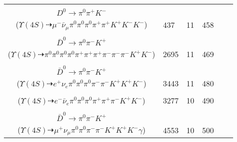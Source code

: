 \documentclass[landscape]{article}
\newcounter{rownumbers}
\newcommand\rn{\stepcounter{rownumbers}\arabic{rownumbers}}
\newcommand{\EOLP}{\\ \hline} %
\newcommand{\topoTags}[1]{#1} %
\begin{document}
\begin{longtable}{clcccc}
\rn & \makecell[l]{ $ 
\Upsilon(4S) \rightarrow B^{+} B^{-} ,
B^{+} \rightarrow \rho^{+} \bar{D}^{0} ,
B^{-} \rightarrow \mu^{-} \bar{\nu}_{\mu} D^{*0} ,
\rho^{+} \rightarrow \pi^{0} \pi^{+} ,
\bar{D}^{0} \rightarrow K^{+} K^{-} ,
D^{*0} \rightarrow \pi^{0} D^{0} ,
$ \\ $
D^{0} \rightarrow \pi^{0} \pi^{+} K^{-} 
$ \\ ($
\Upsilon(4S) \dashrightarrow \mu^{-} \bar{\nu}_{\mu} \pi^{0} \pi^{0} \pi^{0} \pi^{+} \pi^{+} K^{+} K^{-} K^{-} 
$) } & \topoTags{437 & }11 & 458 \EOLP

\rn & \makecell[l]{ $ 
\Upsilon(4S) \rightarrow B^{+} B^{-} ,
B^{+} \rightarrow \pi^{0} \pi^{+} \pi^{+} \pi^{-} \bar{D}^{*0} ,
B^{-} \rightarrow \rho^{-} D^{0} ,
\bar{D}^{*0} \rightarrow \pi^{0} \bar{D}^{0} ,
\rho^{-} \rightarrow \pi^{0} \pi^{-} ,
D^{0} \rightarrow \pi^{+} K^{-} ,
$ \\ $
\bar{D}^{0} \rightarrow \pi^{0} \pi^{-} K^{+} 
$ \\ ($
\Upsilon(4S) \dashrightarrow \pi^{0} \pi^{0} \pi^{0} \pi^{0} \pi^{+} \pi^{+} \pi^{+} \pi^{-} \pi^{-} \pi^{-} K^{+} K^{-} 
$) } & \topoTags{2695 & }11 & 469 \EOLP

\rn & \makecell[l]{ $ 
\Upsilon(4S) \rightarrow B^{+} B^{-} ,
B^{+} \rightarrow e^{+} \nu_{e} \bar{D}^{*0} ,
B^{-} \rightarrow \rho^{-} D^{0} ,
\bar{D}^{*0} \rightarrow \pi^{0} \bar{D}^{0} ,
\rho^{-} \rightarrow \pi^{0} \pi^{-} ,
D^{0} \rightarrow K^{+} K^{-} ,
$ \\ $
\bar{D}^{0} \rightarrow \pi^{0} \pi^{-} K^{+} 
$ \\ ($
\Upsilon(4S) \dashrightarrow e^{+} \nu_{e} \pi^{0} \pi^{0} \pi^{0} \pi^{-} \pi^{-} K^{+} K^{+} K^{-} 
$) } & \topoTags{3443 & }11 & 480 \EOLP

\rn & \makecell[l]{ $ 
\Upsilon(4S) \rightarrow B^{+} B^{-} ,
B^{+} \rightarrow \rho^{+} \bar{D}^{0} ,
B^{-} \rightarrow e^{-} \bar{\nu}_{e} D^{0} ,
\rho^{+} \rightarrow \pi^{0} \pi^{+} ,
\bar{D}^{0} \rightarrow \pi^{0} \pi^{-} K^{+} ,
D^{0} \rightarrow \pi^{0} \pi^{+} K^{-} 
$ \\ ($
\Upsilon(4S) \dashrightarrow e^{-} \bar{\nu}_{e} \pi^{0} \pi^{0} \pi^{0} \pi^{+} \pi^{+} \pi^{-} K^{+} K^{-} 
$) } & \topoTags{3277 & }10 & 490 \EOLP

\rn & \makecell[l]{ $ 
\Upsilon(4S) \rightarrow B^{+} B^{-} ,
B^{+} \rightarrow \mu^{+} \nu_{\mu} \bar{D}^{*0} ,
B^{-} \rightarrow \rho^{-} D^{0} ,
\bar{D}^{*0} \rightarrow \bar{D}^{0} \gamma ,
\rho^{-} \rightarrow \pi^{0} \pi^{-} ,
D^{0} \rightarrow K^{+} K^{-} ,
$ \\ $
\bar{D}^{0} \rightarrow \pi^{0} \pi^{-} K^{+} 
$ \\ ($
\Upsilon(4S) \dashrightarrow \mu^{+} \nu_{\mu} \pi^{0} \pi^{0} \pi^{-} \pi^{-} K^{+} K^{+} K^{-} \gamma 
$) } & \topoTags{4553 & }10 & 500 \EOLP


\end{longtable}
\end{document}
